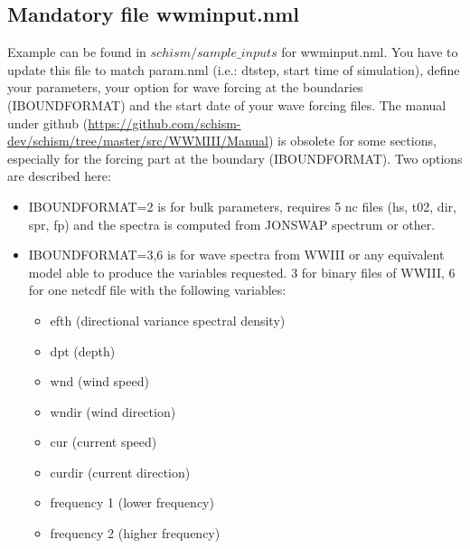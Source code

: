 \documentclass[preprints,briefreport,accept,oneauthor,pdftex]{Definitions/mdpi}
\begin{document}
\subsection{Mandatory file wwminput.nml}
\noindent Example can be found in $schism/sample\_inputs$ for wwminput.nml. You have to update this file to match param.nml (i.e.: dtstep, start time of simulation), define your parameters, your option for wave forcing at the boundaries (IBOUNDFORMAT) and the start date of your wave forcing files. The manual under github (\url{https://github.com/schism-dev/schism/tree/master/src/WWMIII/Manual}) is obsolete for some sections, especially for the forcing part at the boundary (IBOUNDFORMAT). Two options are described here:
\begin{itemize}
    \item IBOUNDFORMAT=2 is for bulk parameters, requires 5 nc files (hs, t02, dir, spr, fp) and the spectra is computed from JONSWAP spectrum or other.
    \item IBOUNDFORMAT=3,6 is for wave spectra from WWIII or any equivalent model able to produce the variables requested. 3 for binary files of WWIII, 6 for one netcdf file with the following variables: 
    \begin{itemize}
    \item efth (directional variance spectral density) 
    \item dpt (depth)
    \item wnd (wind speed)
     \item wndir (wind direction)
     \item cur (current speed)
     \item curdir (current direction)
     \item frequency 1 (lower frequency)
     \item frequency 2 (higher frequency)
     \end{itemize}
\end{itemize}
\end{document}
